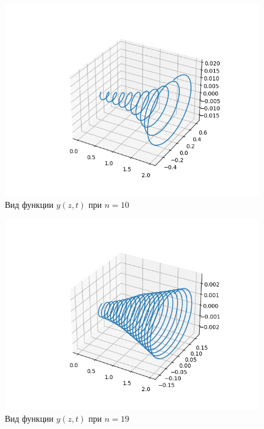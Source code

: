 \documentclass[a4paper,12pt]{article}
\begin{document}
	  \begin{figure}[ht!]
		\begin{center}
		\includegraphics[scale=0.5]{figures/3d_2.png}
		\end{center}
		\vspace*{-8mm}
		\caption{Вид функции $y(z, t)$ при $n = 10$}\label{fig:fig10}
  	\end{figure}

	\begin{figure}[ht!]
		\begin{center}
		\includegraphics[scale=0.5]{figures/3d_3.png}
		\end{center}
		\vspace*{-8mm}
		\caption{Вид функции $y(z, t)$ при $n = 19$}\label{fig:fig11}
  	\end{figure}
\end{document}
